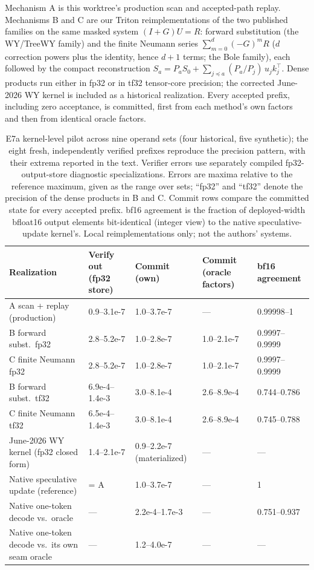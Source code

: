 \documentclass[conference]{IEEEtran}
\begin{document}
Mechanism A is this worktree's production scan and accepted-path replay. Mechanisms B and C are our Triton reimplementations of the two published families on the same masked system $(I+G)U=R$: forward substitution (the WY/TreeWY family) and the finite Neumann series $\sum_{m=0}^{d}(-G)^mR$ ($d$ correction powers plus the identity, hence $d+1$ terms; the Bole family), each followed by the compact reconstruction $S_a=P_aS_0+\sum_{j\preceq a}(P_a/P_j)\,u_jk_j^\top$. Dense products run either in fp32 or in tf32 tensor-core precision; the corrected June-2026 WY kernel is included as a historical realization. Every accepted prefix, including zero acceptance, is committed, first from each method's own factors and then from identical oracle factors.

\begin{table}[t]
\caption{E7a kernel-level pilot across nine operand sets (four historical, five synthetic); the eight fresh, independently verified prefixes reproduce the precision pattern, with their extrema reported in the text. Verifier errors use separately compiled fp32-output-store diagnostic specializations. Errors are maxima relative to the reference maximum, given as the range over sets; ``fp32'' and ``tf32'' denote the precision of the dense products in B and C. Commit rows compare the committed state for every accepted prefix. bf16 agreement is the fraction of deployed-width bfloat16 output elements bit-identical (integer view) to the native speculative-update kernel's. Local reimplementations only; not the authors' systems.}
\label{tab:e7a}
\centering\small
\begin{tabularx}{\textwidth}{@{}p{}YYYY@{}}
\toprule
Realization & Verify out (fp32 store) & Commit (own) & Commit (oracle factors) & bf16 agreement \\
\midrule
A scan + replay (production) & 0.9--3.1e-7 & 1.0--3.7e-7 & --- & 0.99998--1 \\
B forward subst.\ fp32 & 2.8--5.2e-7 & 1.0--2.8e-7 & 1.0--2.1e-7 & 0.9997--0.9999 \\
C finite Neumann fp32 & 2.8--5.2e-7 & 1.0--2.8e-7 & 1.0--2.1e-7 & 0.9997--0.9999 \\
B forward subst.\ tf32 & 6.9e-4--1.4e-3 & 3.0--8.1e-4 & 2.6--8.9e-4 & 0.744--0.786 \\
C finite Neumann tf32 & 6.5e-4--1.4e-3 & 3.0--8.1e-4 & 2.6--8.9e-4 & 0.745--0.788 \\
June-2026 WY kernel (fp32 closed form) & 1.4--2.1e-7 & 0.9--2.2e-7 (materialized) & --- & --- \\
\midrule
Native speculative update (reference) & = A & 1.0--3.7e-7 & --- & 1 \\
Native one-token decode vs.\ oracle & --- & 2.2e-4--1.7e-3 & --- & 0.751--0.937 \\
Native one-token decode vs.\ its own seam oracle & --- & 1.2--4.0e-7 & --- & --- \\
\bottomrule
\end{tabularx}
\end{table}
\end{document}
